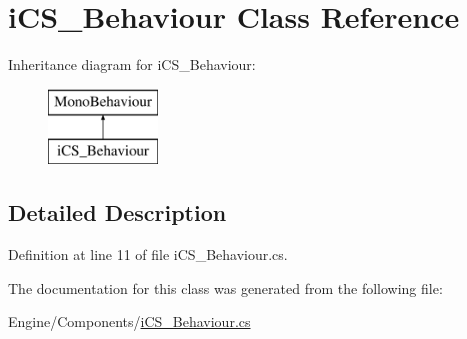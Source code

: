 \hypertarget{classi_c_s___behaviour}{\section{i\+C\+S\+\_\+\+Behaviour Class Reference}
\label{classi_c_s___behaviour}
}
Inheritance diagram for i\+C\+S\+\_\+\+Behaviour\+:\begin{figure}[H]
\begin{center}
\leavevmode
\includegraphics[height=2.000000cm]{classi_c_s___behaviour}
\end{center}
\end{figure}


\subsection{Detailed Description}


Definition at line 11 of file i\+C\+S\+\_\+\+Behaviour.\+cs.



The documentation for this class was generated from the following file\+:\begin{DoxyCompactItemize}
\item 
Engine/\+Components/\hyperlink{i_c_s___behaviour_8cs}{i\+C\+S\+\_\+\+Behaviour.\+cs}\end{DoxyCompactItemize}
